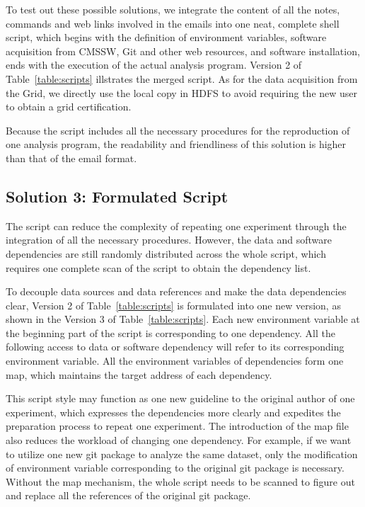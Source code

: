 \documentclass{acm_proc_article-sp}
\begin{document}
To test out these possible solutions, we integrate the content of all the notes, commands and web links involved in the emails into one neat, complete shell script, which begins with the definition of environment variables, software acquisition from CMSSW, Git and other web resources, and software installation, ends with the execution of the actual analysis program. Version 2 of Table~\ref{table:scripts} illstrates the merged script. As for the data acquisition from the Grid, we directly use the local copy in HDFS to avoid requiring the new user to obtain a grid certification.



Because the script includes all the necessary procedures for the reproduction
of one analysis program, the readability and friendliness of this solution is
higher than that of the email format. 


\subsection{Solution 3: Formulated Script}

The script can reduce the complexity of repeating one experiment through the integration of all the necessary procedures. However, the data and software dependencies are still randomly distributed across the whole script, which requires one complete scan of the script to obtain the  dependency list. 

To decouple data sources and data references and make the data dependencies clear, Version 2 of Table~\ref{table:scripts} is formulated into one new version, as shown in
the Version 3 of Table~\ref{table:scripts}. Each new environment variable at the beginning part of
the script is corresponding to one dependency. All the following access to data
or software dependency will refer to its corresponding environment variable.
All the environment variables of dependencies form one map, which maintains the
target address of each dependency.

This script style may function as one new guideline to the original author of
one experiment, which expresses the dependencies more clearly and expedites the
preparation process to repeat one experiment. The introduction of the map file
also reduces the workload of changing one dependency. For example, if we want
to utilize one new git package to analyze the same dataset, only the modification of
environment variable corresponding to the original git package is necessary.
Without the map mechanism, the whole script needs to be scanned to figure out and
replace all the references of the original git package.
\end{document}

